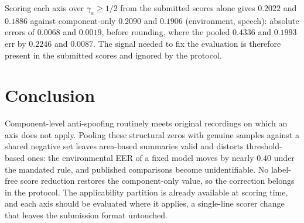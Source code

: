 \documentclass{article}
\begin{document}
Scoring each axis over $\gamma_a\ge1/2$ from the submitted scores alone gives $0.2022$ and $0.1886$ against component-only $0.2090$ and $0.1906$ (environment, speech): absolute errors of $0.0068$ and $0.0019$, before rounding, where the pooled $0.4336$ and $0.1993$ err by $0.2246$ and $0.0087$. The signal needed to fix the evaluation is therefore present in the submitted scores and ignored by the protocol.

\section{Conclusion}
\label{sec:conc}

Component-level anti-spoofing routinely meets original recordings on which an axis does not apply. Pooling these structural zeros with genuine samples against a shared negative set leaves area-based summaries valid and distorts threshold-based ones: the environmental EER of a fixed model moves by nearly $0.40$ under the mandated rule, and published comparisons become unidentifiable. No label-free score reduction restores the component-only value, so the correction belongs in the protocol. The applicability partition is already available at scoring time, and each axis should be evaluated where it applies, a single-line scorer change that leaves the submission format untouched.
\end{document}
